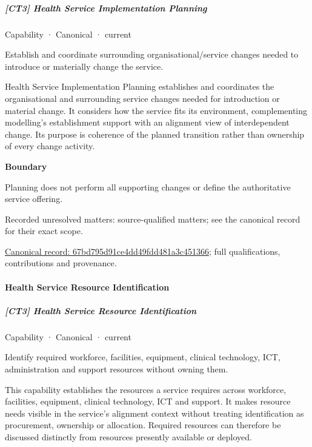 \subparagraph{[CT3] Health Service Implementation Planning}

\label{element:67bd795d91ce4dd49fdd481a3c451366}
{\small Capability · Canonical · current}\par

Establish and coordinate surrounding organisational/service changes needed to introduce or materially change the service.



Health Service Implementation Planning establishes and coordinates the organisational and surrounding service changes needed for introduction or material change. It considers how the service fits its environment, complementing modelling's establishment support with an alignment view of interdependent change. Its purpose is coherence of the planned transition rather than ownership of every change activity.



\textbf{Boundary}



Planning does not perform all supporting changes or define the authoritative service offering.


{\small Recorded unresolved matters: source-qualified matters; see the canonical record for their exact scope.}\par
{\footnotesize \href{../../../../continuum/strategy/capability/67bd795d91ce4dd49fdd481a3c451366.md}{Canonical record: 67bd795d91ce4dd49fdd481a3c451366}; full qualifications, contributions and provenance.}\par
\paragraph{Health Service Resource Identification}

\subparagraph{[CT3] Health Service Resource Identification}

\label{element:7d46575486c847cd8fdbb665b3ed1090}
{\small Capability · Canonical · current}\par

Identify required workforce, facilities, equipment, clinical technology, ICT, administration and support resources without owning them.



This capability establishes the resources a service requires across workforce, facilities, equipment, clinical technology, ICT and support. It makes resource needs visible in the service's alignment context without treating identification as procurement, ownership or allocation. Required resources can therefore be discussed distinctly from resources presently available or deployed.




